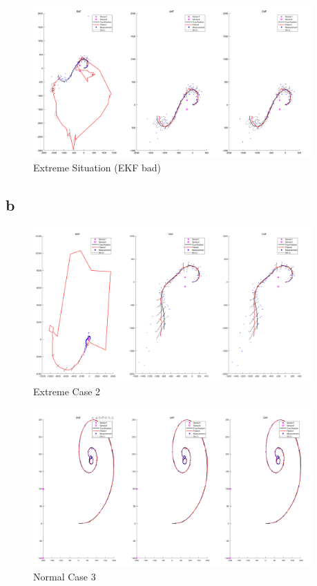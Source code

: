 \begin{figure}[H]
 \centering
 \includegraphics[width=0.95\textwidth]{images/extremea.png}
 \caption{Extreme Situation (EKF bad)}
 \label{EKFbad}
\end{figure}

\subsection{b}

\begin{figure}[H]
 \centering
 \includegraphics[width=0.95\textwidth]{images/extreme.png}
 \caption{Extreme Case 2}
 \label{extremecase2}
\end{figure}

\begin{figure}[H]
 \centering
 \includegraphics[width=0.95\textwidth]{images/Normalcase3.png}
 \caption{Normal Case 3}
 \label{2b}
\end{figure}

